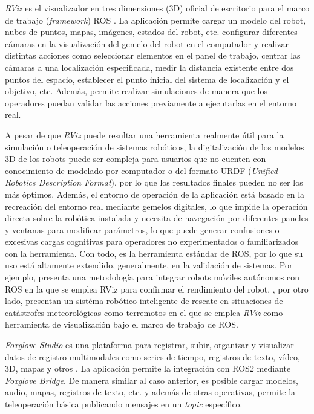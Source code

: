 \textit{RViz} es el visualizador en tres dimensiones (3D) oficial 
de escritorio para el marco
de trabajo (\textit{framework}) ROS \parencite{rosRVizUser}.
La aplicación permite cargar un modelo del robot, nubes de puntos, mapas,
imágenes, estados del robot, etc. configurar diferentes cámaras en 
la visualización del gemelo del robot en el computador y realizar distintas 
acciones como seleccionar elementos en el panel de trabajo, centrar las 
cámaras a una localización especificada, medir la distancia existente
entre dos puntos del espacio, establecer el punto inicial del sistema 
de localización y el objetivo, etc. Además, permite realizar simulaciones 
de manera que los operadores puedan validar las acciones previamente
a ejecutarlas en el entorno real. 

A pesar de que \textit{RViz} puede resultar una herramienta realmente útil
para la simulación o teleoperación de sistemas robóticos, la digitalización 
de los modelos 3D de los robots puede ser compleja para usuarios que 
no cuenten con conocimiento de modelado por computador o del formato 
URDF (\textit{Unified Robotics Description Format}), por lo 
que los resultados finales pueden no ser los más óptimos. Además, 
el entorno de operación de la aplicación está basado en la recreación del 
entorno real mediante gemelos digitales, lo que impide la operación 
directa sobre la robótica instalada y necesita de navegación 
por diferentes paneles y ventanas para modificar parámetros, lo que puede generar confusiones o 
excesivas cargas cognitivas para operadores no experimentados o 
familiarizados con la herramienta. Con todo, es la herramienta estándar de ROS, por lo que 
su uso está altamente extendido, generalmente, en la validación de sistemas. Por ejemplo, 
\cite{Rezgui2025} presenta una metodología para integrar robots móviles autónomos con ROS en la que se emplea RViz para
confirmar el rendimiento del robot.
\cite{ctx3510288280009461}, por otro lado, presentan un sistéma robótico inteligente
de rescate en situaciones de catástrofes meteorológicas como terremotos
en el que se emplea \textit{RViz} como herramienta de visualización bajo el marco de trabajo de ROS. 

\textit{Foxglove Studio} es una plataforma para registrar, subir, organizar
y visualizar datos de registro multimodales como series de tiempo, 
registros de texto, vídeo, 3D, mapas y otros \parencite{foxgloveFoxgloveDocumentation}.
La aplicación permite la integración con ROS2 mediante \textit{Foxglove Bridge}. 
De manera similar al caso anterior, es posible cargar modelos, audio, mapas, registros 
de texto, etc. y además de otras operativas, permite la teleoperación básica publicando 
mensajes en un \textit{topic} específico.


